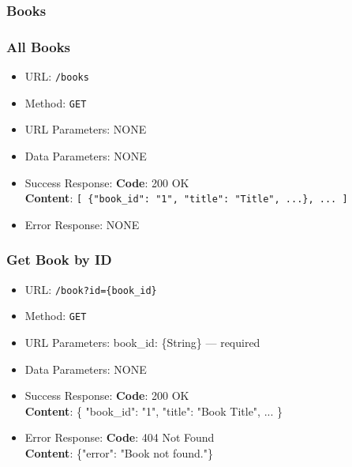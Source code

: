 \subsubsection*{Books}

\subsubsection*{All Books}

\begin{itemize}
    \item URL: \texttt{/books}
    \item Method: \texttt{GET}
    \item URL Parameters: NONE
    \item Data Parameters: NONE

    \item Success Response: \newline
    \textbf{Code}: 200 OK \\
    \textbf{Content}: \texttt{[ \{"book\_id": "1", "title": "Title", ...\}, ... ]}

    \item Error Response: NONE
\end{itemize}

\subsubsection*{Get Book by ID}

\begin{itemize}
    \item URL: \texttt{/book?id=\{book\_id\}}
    \item Method: \texttt{GET}
    \item URL Parameters: book\_id: \{String\} — required
    \item Data Parameters: NONE

    \item Success Response: \newline
    \textbf{Code}: 200 OK \\
    \textbf{Content}: \{ "book\_id": "1", "title": "Book Title", ... \}

    \item Error Response: \newline
    \textbf{Code}: 404 Not Found \\
    \textbf{Content}: \{"error": "Book not found."\}
\end{itemize}

